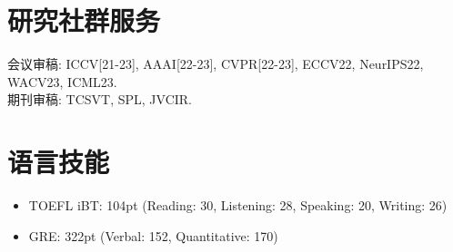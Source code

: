 \documentclass{resume}
\begin{document}
\vspace{-2mm}

\section{研究社群服务}
会议审稿: ICCV[21-23], AAAI[22-23], CVPR[22-23], ECCV22, NeurIPS22, WACV23, ICML23.  \\
期刊审稿: TCSVT, SPL, JVCIR.

\vspace{-2mm}

\section{语言技能}
\begin{itemize}[parsep=0.5ex]
    \item TOEFL iBT: 104pt (Reading: 30, Listening: 28, Speaking: 20, Writing: 26)
    \item GRE: 322pt (Verbal: 152, Quantitative: 170)
\end{itemize}
\end{document}

